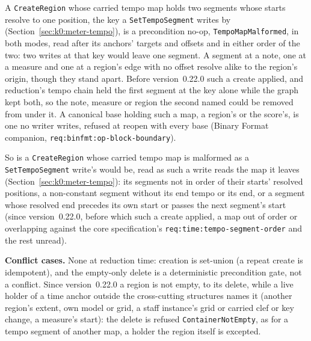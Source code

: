 \documentclass[11pt,letterpaper]{report}
\begin{document}
A \texttt{CreateRegion} whose carried tempo map holds two segments whose
starts resolve to one position, the key a \texttt{SetTempoSegment} writes by
(Section~\ref{sec:k0:meter-tempo}), is a precondition no-op,
\texttt{TempoMapMalformed}, in both modes, read after its anchors' targets and
offsets and in either order of the two: two writes at that key would leave
one segment. A segment at a note, one at a measure and one at a region's edge
with no offset resolve alike to the region's origin, though they stand apart.
Before version~0.22.0 such a create applied, and reduction's tempo chain held
the first segment at the key alone while the graph kept both, so the note,
measure or region the second named could be removed from under it. A canonical
base holding such a map, a region's or the score's, is one no writer writes,
refused at reopen with every base (Binary Format companion,
\texttt{req:binfmt:op-block-boundary}).

So is a \texttt{CreateRegion} whose carried tempo map is malformed as a
\texttt{SetTempoSegment} write's would be, read as such a write reads the
map it leaves (Section~\ref{sec:k0:meter-tempo}): its segments not in order of
their starts' resolved positions, a non-constant segment without its end
tempo or its end, or a segment whose resolved end precedes its own start or
passes the next segment's start (since version~0.22.0, before which such a
create applied, a map out of order or overlapping against
the core specification's \texttt{req:time:tempo-segment-order} and the
rest unread).

\textbf{Conflict cases.} None at reduction time: creation is set-union (a repeat
create is idempotent), and the empty-only delete is a deterministic precondition
gate, not a conflict. Since version~0.22.0 a region is not empty, to its
delete, while a live holder of a time anchor outside the cross-cutting
structures names it (another region's extent, own model or grid, a staff
instance's grid or carried clef or key change, a measure's start): the delete
is refused \texttt{ContainerNotEmpty}, as for a tempo segment of another map,
a holder the region itself is excepted.
\end{document}
